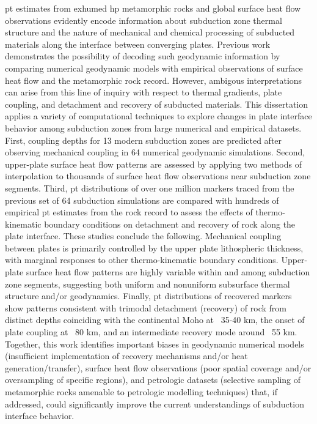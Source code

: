 \Gls{pt} estimates from exhumed \gls{hp} metamorphic rocks and global surface heat flow observations evidently encode information about subduction zone thermal structure and the nature of mechanical and chemical processing of subducted materials along the interface between converging plates. Previous work demonstrates the possibility of decoding such geodynamic information by comparing numerical geodynamic models with empirical observations of surface heat flow and the metamorphic rock record. However, ambigous interpretations can arise from this line of inquiry with respect to thermal gradients, plate coupling, and detachment and recovery of subducted materials. This dissertation applies a variety of computational techniques to explore changes in plate interface behavior among subduction zones from large numerical and empirical datasets. First, coupling depths for 13 modern subduction zones are predicted after observing mechanical coupling in 64 numerical geodynamic simulations. Second, upper-plate surface heat flow patterns are assessed by applying two methods of interpolation to thousands of surface heat flow observations near subduction zone segments. Third, \gls{pt} distributions of over one million markers traced from the previous set of 64 subduction simulations are compared with hundreds of empirical \gls{pt} estimates from the rock record to assess the effects of thermo-kinematic boundary conditions on detachment and recovery of rock along the plate interface. These studies conclude the following. Mechanical coupling between plates is primarily controlled by the upper plate lithospheric thickness, with marginal responses to other thermo-kinematic boundary conditions. Upper-plate surface heat flow patterns are highly variable within and among subduction zone segments, suggesting both uniform and nonuniform subsurface thermal structure and/or geodynamics. Finally, \gls{pt} distributions of recovered markers show patterns consistent with trimodal detachment (recovery) of rock from distinct depths coinciding with the continental Moho at ~35-40 km, the onset of plate coupling at ~80 km, and an intermediate recovery mode around ~55 km. Together, this work identifies important biases in geodynamic numerical models (insufficient implementation of recovery mechanisms and/or heat generation/transfer), surface heat flow observations (poor spatial coverage and/or oversampling of specific regions), and petrologic datasets (selective sampling of metamorphic rocks amenable to petrologic modelling techniques) that, if addressed, could significantly improve the current understandings of subduction interface behavior.